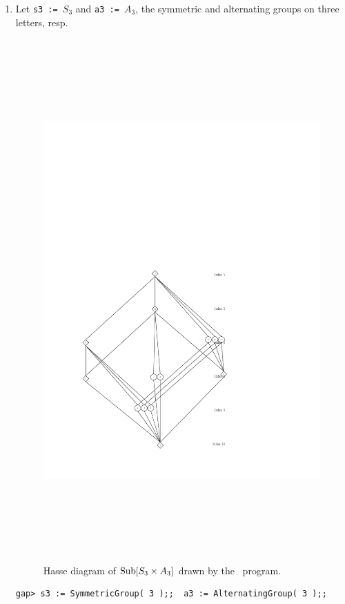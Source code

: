\begin{enumerate}
\item 
Let 
{\tt s3 := $S_3$} and {\tt a3 := $A_3$}, 
the symmetric and alternating groups on three letters, resp.
\begin{figure}[!ht]\begin{center}
\vspace{-8cm}
\includegraphics[height=20cm]{inputs/s3a3new.pdf}%
\caption{Hasse diagram of $\mathrm{Sub}[S_3 \times A_3]$ drawn by the \xgap\ program.}
\label{fig:s3a3}
\end{center}\end{figure}
{\codesize
\begin{verbatim}
gap> s3 := SymmetricGroup( 3 );;  a3 := AlternatingGroup( 3 );;


\end{verbatim}}
\end{enumerate}
